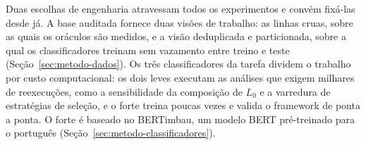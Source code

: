Duas escolhas de engenharia atravessam todos os experimentos e convém
fixá-las desde já. A base auditada fornece duas visões de trabalho: as
linhas cruas, sobre as quais os oráculos são medidos, e a visão deduplicada
e particionada, sobre a qual os classificadores treinam sem vazamento entre
treino e teste (Seção~\ref{sec:metodo-dados}). Os três classificadores da
tarefa dividem o trabalho por custo computacional: os dois leves executam
as análises que exigem milhares de reexecuções, como a sensibilidade da
composição de $L_0$ e a varredura de estratégias de seleção, e o forte
treina poucas vezes e valida o framework de ponta a ponta. O forte é
baseado no BERTimbau, um modelo BERT pré-treinado para o português
(Seção~\ref{sec:metodo-classificadores}).
